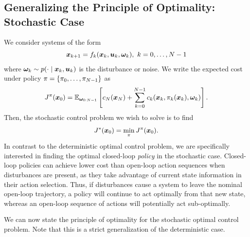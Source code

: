 



\subsection{Generalizing the Principle of Optimality: Stochastic Case}

We consider systems of the form
\begin{equation}
    \bm{x}_{k+1} = f_k(\bm{x}_k,\bm{u}_k,\bm{\omega}_k), \,\, k=0,\ldots,N-1
\end{equation}
where $\bm{\omega}_k \sim p(\cdot \mid \bm{x}_k, \bm{u}_k)$ is the disturbance or noise. We write the expected cost under policy $\pi = \{\pi_0, \ldots, \pi_{N-1}\}$ as
\begin{equation}
    \label{eq:stoch_bellman}
    J^\pi(\bm{x}_0) = \mathbb{E}_{\bm{\omega}_{0:N-1}} \left[ c_N(\bm{x}_N) + \sum_{k=0}^{N-1} c_k(\bm{x}_k,\pi_k(\bm{x}_k),\bm{\omega}_k) \right].
\end{equation}
Then, the stochastic control problem we wish to solve is to find
\begin{equation}
    J^*(\bm{x}_0) = \min_\pi J^\pi(\bm{x}_0).
\end{equation}
In contrast to the deterministic optimal control problem, we are specifically interested in finding the optimal closed-loop \textit{policy} in the stochastic case. Closed-loop policies can achieve lower cost than open-loop action sequences when disturbances are present, as they take advantage of current state information in their action selection. Thus, if disturbances cause a system to leave the nominal open-loop trajectory, a policy will continue to act optimally from that new state, whereas an open-loop sequence of actions will potentially act sub-optimally. 


We can now state the principle of optimality for the stochastic optimal control problem. Note that this is a strict generalization of the deterministic case. 

